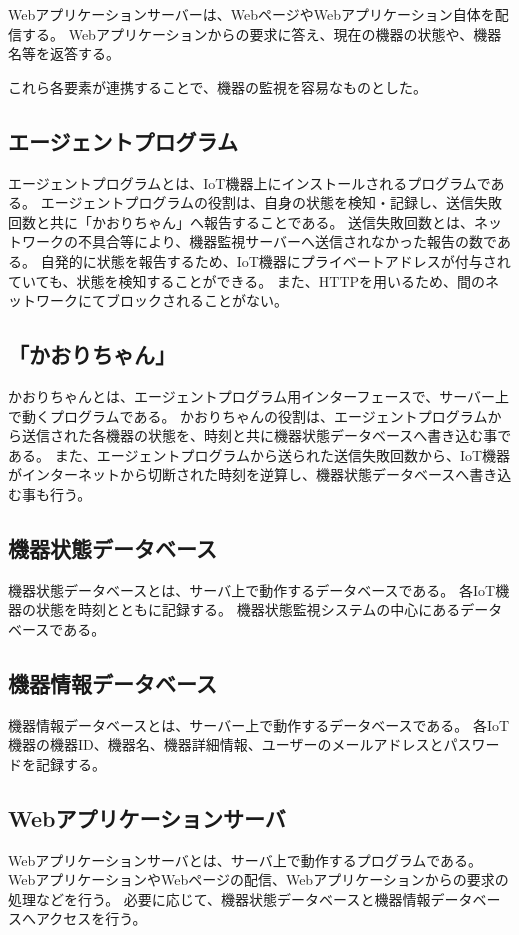 Webアプリケーションサーバーは、WebページやWebアプリケーション自体を配信する。
Webアプリケーションからの要求に答え、現在の機器の状態や、機器名等を返答する。
\medskip

これら各要素が連携することで、機器の監視を容易なものとした。

\subsection{エージェントプログラム}
エージェントプログラムとは、IoT機器上にインストールされるプログラムである。
エージェントプログラムの役割は、自身の状態を検知・記録し、送信失敗回数と共に「かおりちゃん」へ報告することである。
送信失敗回数とは、ネットワークの不具合等により、機器監視サーバーへ送信されなかった報告の数である。
自発的に状態を報告するため、IoT機器にプライベートアドレスが付与されていても、状態を検知することができる。
また、HTTPを用いるため、間のネットワークにてブロックされることがない。

\subsection{「かおりちゃん」}
かおりちゃんとは、エージェントプログラム用インターフェースで、サーバー上で動くプログラムである。
かおりちゃんの役割は、エージェントプログラムから送信された各機器の状態を、時刻と共に機器状態データベースへ書き込む事である。
また、エージェントプログラムから送られた送信失敗回数から、IoT機器がインターネットから切断された時刻を逆算し、機器状態データベースへ書き込む事も行う。


\subsection{機器状態データベース}
機器状態データベースとは、サーバ上で動作するデータベースである。
各IoT機器の状態を時刻とともに記録する。
機器状態監視システムの中心にあるデータベースである。

\subsection{機器情報データベース}
機器情報データベースとは、サーバー上で動作するデータベースである。
各IoT機器の機器ID、機器名、機器詳細情報、ユーザーのメールアドレスとパスワードを記録する。

\subsection{Webアプリケーションサーバ}
Webアプリケーションサーバとは、サーバ上で動作するプログラムである。
WebアプリケーションやWebページの配信、Webアプリケーションからの要求の処理などを行う。
必要に応じて、機器状態データベースと機器情報データベースへアクセスを行う。

